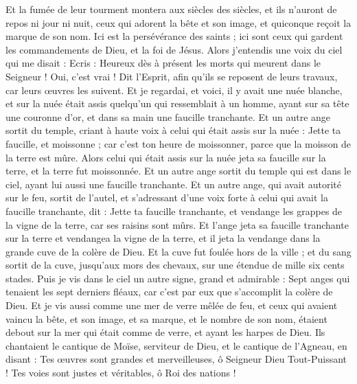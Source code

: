 \begin{multicols}{2}
Et la fumée de leur tourment montera aux siècles des siècles, et ils n'auront de repos ni jour ni nuit, ceux qui adorent la bête et son image, et quiconque reçoit la marque de son nom.
Ici est la persévérance des saints ; ici sont ceux qui gardent les commandements de Dieu, et la foi de Jésus.
Alors j'entendis une voix du ciel qui me disait : Ecris : Heureux dès à présent les morts qui meurent dans le Seigneur ! Oui, c'est vrai ! Dit l'Esprit, afin qu'ils se reposent de leurs travaux, car leurs œuvres les suivent.
Et je regardai, et voici, il y avait une nuée blanche, et sur la nuée était assis quelqu'un qui ressemblait à un homme, ayant sur sa tête une couronne d'or, et dans sa main une faucille tranchante.
Et un autre ange sortit du temple, criant à haute voix à celui qui était assis sur la nuée : Jette ta faucille, et moissonne ; car c'est ton heure de moissonner, parce que la moisson de la terre est mûre.
Alors celui qui était assis sur la nuée jeta sa faucille sur la terre, et la terre fut moissonnée.
Et un autre ange sortit du temple qui est dans le ciel, ayant lui aussi une faucille tranchante.
Et un autre ange, qui avait autorité sur le feu, sortit de l'autel, et s'adressant d'une voix forte à celui qui avait la faucille tranchante, dit : Jette ta faucille tranchante, et vendange les grappes de la vigne de la terre, car ses raisins sont mûrs.
Et l'ange jeta sa faucille tranchante sur la terre et vendangea la vigne de la terre, et il jeta la vendange dans la grande cuve de la colère de Dieu.
Et la cuve fut foulée hors de la ville ; et du sang sortit de la cuve, jusqu'aux mors des chevaux, sur une étendue de mille six cents stades.
\VerseOne{}Puis je vis dans le ciel un autre signe, grand et admirable : Sept anges qui tenaient les sept derniers fléaux, car c'est par eux que s'accomplit la colère de Dieu.
Et je vis aussi comme une mer de verre mêlée de feu, et ceux qui avaient vaincu la bête, et son image, et sa marque, et le nombre de son nom, étaient debout sur la mer qui était comme de verre, et ayant les harpes de Dieu.
Ils chantaient le cantique de Moïse, serviteur de Dieu, et le cantique de l'Agneau, en disant : Tes œuvres sont grandes et merveilleuses, ô Seigneur Dieu Tout-Puissant ! Tes voies sont justes et véritables, ô Roi des nations !

\end{multicols}
